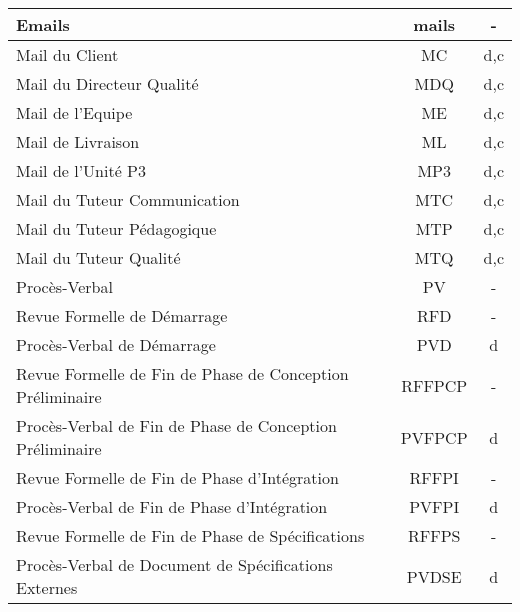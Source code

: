 \begin{longtable}{|p{12cm}|c|c|}
    \hline
    \hspace{1cm} Emails & mails & -\\
    \hline
    \hspace{2cm} Mail du Client & MC & d,c\\
    \hline
    \hspace{2cm} Mail du Directeur Qualité & MDQ & d,c\\
    \hline
    \hspace{2cm} Mail de l'Equipe & ME & d,c\\
    \hline
    \hspace{2cm} Mail de Livraison & ML & d,c\\
    \hline
    \hspace{2cm} Mail de l'Unité P3 & MP3 & d,c\\
    \hline
    \hspace{2cm} Mail du Tuteur Communication & MTC & d,c\\
    \hline
    \hspace{2cm} Mail du Tuteur Pédagogique & MTP & d,c\\
    \hline
    \hspace{2cm} Mail du Tuteur Qualité & MTQ & d,c\\
    \hline
    \hspace{1cm} Procès-Verbal & PV & -\\
    \hline
    \hspace{2cm} Revue Formelle de Démarrage & RFD & -\\
    \hline
    \hspace{3cm} Procès-Verbal de Démarrage & PVD & d\\
    \hline
    \hspace{2cm} Revue Formelle de Fin de Phase de Conception Préliminaire & RFFPCP & -\\
    \hline
    \hspace{3cm} Procès-Verbal de Fin de Phase de Conception Préliminaire & PVFPCP & d\\
    \hline
    \hspace{2cm} Revue Formelle de Fin de Phase d'Intégration & RFFPI & -\\
    \hline
    \hspace{3cm} Procès-Verbal de Fin de Phase d'Intégration & PVFPI & d\\
    \hline
    \hspace{2cm} Revue Formelle de Fin de Phase de Spécifications & RFFPS & -\\
    \hline
    \hspace{3cm} Procès-Verbal de Document de Spécifications Externes & PVDSE & d\\

\end{longtable}

